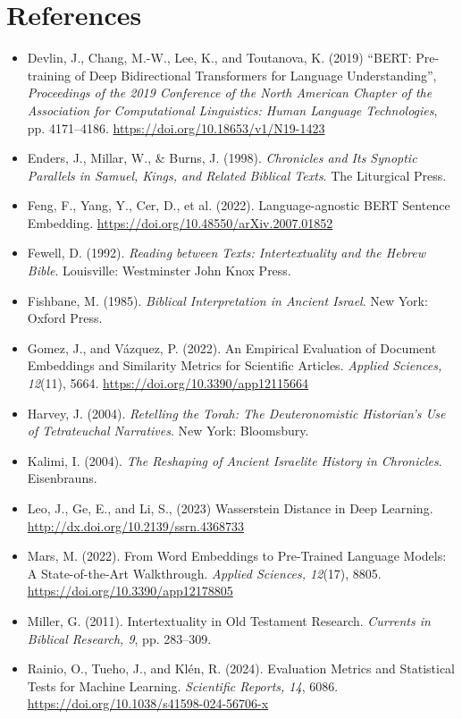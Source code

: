 \documentclass[12pt]{article}
\begin{document}
\section*{References}
\begin{itemize}
    \item Devlin, J., Chang, M.-W., Lee, K., and Toutanova, K. (2019) “BERT: Pre-training of Deep Bidirectional Transformers for Language Understanding”, \textit{Proceedings of the 2019 Conference of the North American Chapter of the Association for Computational Linguistics: Human Language Technologies}, pp. 4171–4186. \url{https://doi.org/10.18653/v1/N19-1423}
    \item Enders, J., Millar, W., \& Burns, J. (1998). \textit{Chronicles and Its Synoptic Parallels in Samuel, Kings, and Related Biblical Texts}. The Liturgical Press.
    \item Feng, F., Yang, Y., Cer, D., et al. (2022). Language-agnostic BERT Sentence Embedding. \url{https://doi.org/10.48550/arXiv.2007.01852}
    \item Fewell, D. (1992). \textit{Reading between Texts: Intertextuality and the Hebrew Bible}. Louisville: Westminster John Knox Press.
    \item Fishbane, M. (1985). \textit{Biblical Interpretation in Ancient Israel}. New York: Oxford Press.
    \item Gomez, J., and Vázquez, P. (2022). An Empirical Evaluation of Document Embeddings and Similarity Metrics for Scientific Articles. \textit{Applied Sciences, 12}(11), 5664. \url{https://doi.org/10.3390/app12115664}
    \item Harvey, J. (2004). \textit{Retelling the Torah: The Deuteronomistic Historian’s Use of Tetrateuchal Narratives}. New York: Bloomsbury.
    \item Kalimi, I. (2004). \textit{The Reshaping of Ancient Israelite History in Chronicles}. Eisenbrauns.
    \item Leo, J., Ge, E., and Li, S., (2023) Wasserstein Distance in Deep Learning. \url{http://dx.doi.org/10.2139/ssrn.4368733} 
    \item Mars, M. (2022). From Word Embeddings to Pre-Trained Language Models: A State-of-the-Art Walkthrough. \textit{Applied Sciences, 12}(17), 8805. \url{https://doi.org/10.3390/app12178805}
    \item Miller, G. (2011). Intertextuality in Old Testament Research. \textit{Currents in Biblical Research, 9}, pp. 283–309.
    \item Rainio, O., Tueho, J., and Klén, R. (2024). Evaluation Metrics and Statistical Tests for Machine Learning. \textit{Scientific Reports, 14}, 6086. \url{https://doi.org/10.1038/s41598-024-56706-x}

\end{itemize}
\end{document}
